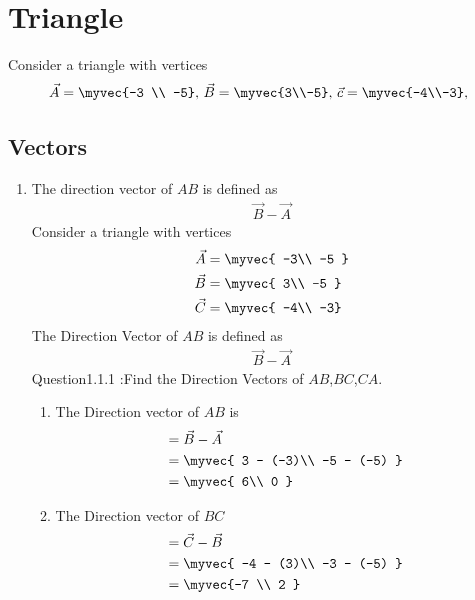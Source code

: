 \documentclass[11pt]{book}
\begin{document}
\frontmatter
\tableofcontents
\setcounter{page}{1}
\mainmatter
\chapter{Triangle}
Consider a triangle with vertices
\begin{align}
\label{eq:tri-pts}
\vec{A}=\myvec{-3 \\ -5},\,
\vec{B}=\myvec{3\\-5},\,
	\vec{c}=\myvec{-4\\-3},\,
\end{align}

\section{Vectors}


\begin{enumerate}[label=\thesection.\arabic*.,ref=\thesection.\theenumi]

\item The direction vector of $AB$ is defined as
		\begin{align}
			\vec{B}-
			\vec{A}
		\end{align}
Consider a triangle with vertices
\begin{align} 
 \vec{A} &= \myvec{ -3\\ -5 } \\ \vec{B} &= \myvec{ 3\\ -5 }
  \\\vec{C} &= \myvec{ -4\\ -3}
 \end{align}
The Direction Vector of $AB$ is defined as 
\begin{align} 
\vec{B} - \vec{A}
\end{align}
Question1.1.1 :Find the Direction Vectors of $AB$,$BC$,$CA$.\\
\solution

\begin{enumerate} 
\item  The Direction vector of $AB$ is \begin{align} &= \vec{B} - \vec{A} \\
 &= \myvec{ 3 - (-3)\\ -5 - (-5) } \\&= \myvec{ 6\\ 0 }
 \end{align}
 
\item The Direction vector of $BC$ \begin{align}&= \vec{C} - \vec{B}\\
 &= \myvec{ -4 - (3)\\ -3 - (-5) } \\&= \myvec{-7 \\ 2 }
  \end{align}
  

\end{enumerate}
\end{enumerate}
\end{document}
